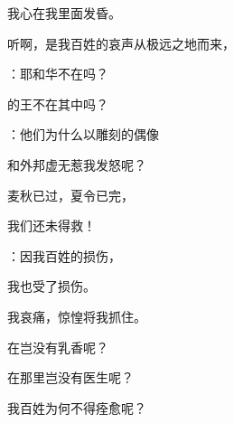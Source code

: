{\par }{\Q 我心在我里面发昏。
\par }{\Q {}听啊，是我百姓的哀声从极远之地而来，
\par }{：耶和华不在{}吗？
\par }{的王不在其中吗？
\par }{：他们为什么以雕刻的偶像
\par }{\Q 和外邦虚无{}惹我发怒呢？
\par }{\Q {}麦秋已过，夏令已完，
\par }{\Q 我们还未得救！
\par }{\Q {}：因我百姓的损伤，
\par }{\Q 我也受了损伤。
\par }{\Q 我哀痛，惊惶将我抓住。
\par }{\BB \par }{\Q {}在{}岂没有乳香呢？
\par }{\Q 在那里岂没有医生呢？
\par }{\Q 我百姓为何不得痊愈呢？

}
